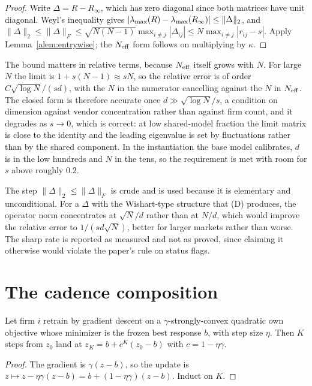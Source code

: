 \begin{proof}
Write $\Delta = R - R_\infty$, which has zero diagonal since both matrices have unit diagonal. Weyl's inequality gives $|\lambda_{\max}(R)-\lambda_{\max}(R_\infty)| \leq \|\Delta\|_2$, and $\|\Delta\|_2 \leq \|\Delta\|_F \leq \sqrt{N(N-1)}\max_{i\neq j}|\Delta_{ij}| \leq N\max_{i \neq j}|r_{ij}-s|$. Apply Lemma~\ref{alem:entrywise}; the $N_{\mathrm{eff}}$ form follows on multiplying by $\kappa$.
\end{proof}

The bound matters in relative terms, because $N_{\mathrm{eff}}$ itself grows with $N$. For large $N$ the limit is $1+s(N-1) \approx sN$, so the relative error is of order $C\sqrt{\log N}/(sd)$, with the $N$ in the numerator cancelling against the $N$ in $N_{\mathrm{eff}}$. The closed form is therefore accurate once $d \gg \sqrt{\log N}/s$, a condition on dimension against vendor concentration rather than against firm count, and it degrades as $s \to 0$, which is correct: at low shared-model fraction the limit matrix is close to the identity and the leading eigenvalue is set by fluctuations rather than by the shared component. In the instantiation the base model calibrates, $d$ is in the low hundreds and $N$ in the tens, so the requirement is met with room for $s$ above roughly $0.2$.

The step $\|\Delta\|_2 \leq \|\Delta\|_F$ is crude and is used because it is elementary and unconditional. For a $\Delta$ with the Wishart-type structure that (D) produces, the operator norm concentrates at $\sqrt{N}/d$ rather than at $N/d$, which would improve the relative error to $1/(sd\sqrt{N})$, better for larger markets rather than worse. The sharp rate is reported as measured and not as proved, since claiming it otherwise would violate the paper's rule on status flags.

\section{The cadence composition}
\label{app:cadence}

\begin{alemma}
\label{alem:inner}
Let firm $i$ retrain by gradient descent on a $\gamma$-strongly-convex quadratic own objective whose minimizer is the frozen best response $b$, with step size $\eta$. Then $K$ steps from $z_0$ land at $z_K = b + c^K(z_0-b)$ with $c = 1-\eta\gamma$.
\end{alemma}

\begin{proof}
The gradient is $\gamma(z-b)$, so the update is $z \mapsto z - \eta\gamma(z-b) = b + (1-\eta\gamma)(z-b)$. Induct on $K$.
\end{proof}

